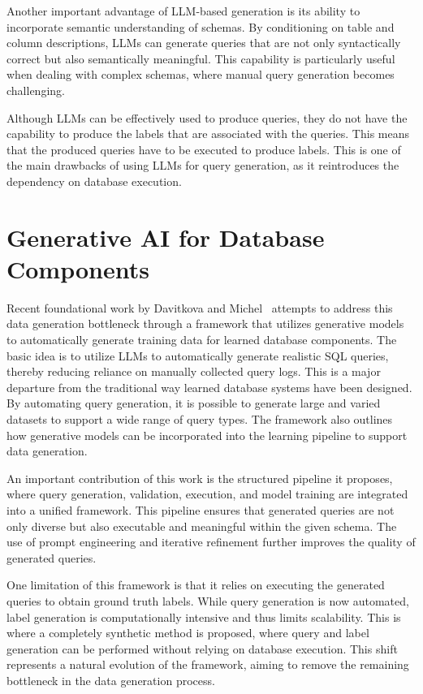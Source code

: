 Another important advantage of LLM-based generation is its ability to incorporate semantic understanding of schemas. By conditioning on table and column descriptions, LLMs can generate queries that are not only syntactically correct but also semantically meaningful. This capability is particularly useful when dealing with complex schemas, where manual query generation becomes challenging.

Although LLMs can be effectively used to produce queries, they do not have the capability to produce the labels that are associated with the queries. This means that the produced queries have to be executed to produce labels. This is one of the main drawbacks of using LLMs for query generation, as it reintroduces the dependency on database execution.

\section{Generative AI for Database Components}

Recent foundational work by Davitkova and Michel~\cite{DBLP:journals/corr/abs-2512-20271} attempts to address this data generation bottleneck through a framework that utilizes generative models to automatically generate training data for learned database components. The basic idea is to utilize LLMs to automatically generate realistic SQL queries, thereby reducing reliance on manually collected query logs.
This is a major departure from the traditional way learned database systems have been designed. By automating query generation, it is possible to generate large and varied datasets to support a wide range of query types. The framework also outlines how generative models can be incorporated into the learning pipeline to support data generation.

An important contribution of this work is the structured pipeline it proposes, where query generation, validation, execution, and model training are integrated into a unified framework. This pipeline ensures that generated queries are not only diverse but also executable and meaningful within the given schema. The use of prompt engineering and iterative refinement further improves the quality of generated queries.

One limitation of this framework is that it relies on executing the generated queries to obtain ground truth labels. While query generation is now automated, label generation is computationally intensive and thus limits scalability. This is where a completely synthetic method is proposed, where query and label generation can be performed without relying on database execution. This shift represents a natural evolution of the framework, aiming to remove the remaining bottleneck in the data generation process.

